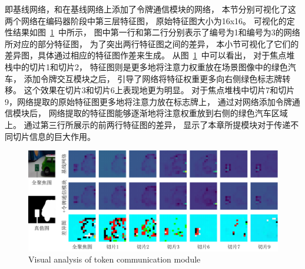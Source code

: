 即基线网络，和在基线网络上添加了令牌通信模块的网络，
本节分别可视化了这两个网络在编码器阶段中第三层特征图，
原始特征图大小为16x16。
可视化的定性结果如图~\ref{chpt3:figure:attn_tcm}~中所示，
图中第一行和第二行分别表示了编号为1和编号为3的网络所对应的部分特征图，
为了突出两行特征图之间的差异，
本小节可视化了它们的差异图，具体通过相应的特征图作差来生成。
从图~\ref{chpt3:figure:attn_tcm}~中可以看出，
对于焦点堆栈中的切片1和切片2，
特征图则是更多地将注意力权重放在场景图像中的绿色汽车，
添加令牌交互模块之后，
引导了网络将特征权重更多向右侧绿色标志牌转移。
这个效果在切片3和切片6上表现地更为明显。
对于焦点堆栈中切片7和切片9，网络提取的原始特征图更多地将注意力放在标志牌上，
通过对网络添加令牌通信模块后，
网络提取的特征图能够逐渐地将注意权重放到右侧的绿色汽车区域上。
通过第三行所展示的前两行特征图的差异，
显示了本章所提模块对于传递不同切片信息的巨大作用。
%
%
%
%
%
%
\begin{figure}[t] 
 	\includegraphics[width=1.\linewidth]{figures/chapter3/attn_cmp_turn} 
 	\centering
 	{Visual analysis of token communication module}
 	\label{chpt3:figure:attn_tcm}
\end{figure}
%
%
